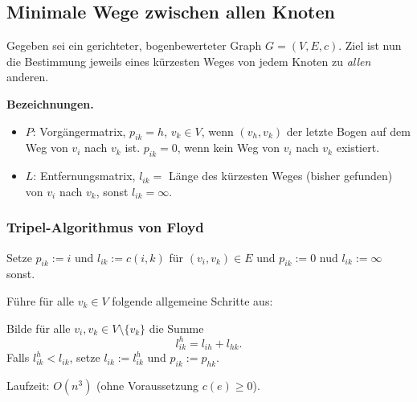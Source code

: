 \subsection{Minimale Wege zwischen allen Knoten}
Gegeben sei ein gerichteter, bogenbewerteter Graph $G = (V,E,c)$. Ziel ist nun
die Bestimmung jeweils eines kürzesten Weges von jedem Knoten zu \emph{allen}
anderen.

\textbf{Bezeichnungen.}
\begin{itemize}
\item $P$: Vorgängermatrix, $p_{ik} = h$, $v_k \in V$, wenn $(v_h, v_k)$ der
  letzte Bogen auf dem Weg von $v_i$ nach $v_k$ ist. $p_{ik} = 0$, wenn kein Weg
  von $v_i$ nach $v_k$ existiert.
\item $L$: Entfernungsmatrix, $l_{ik} =$ Länge des kürzesten Weges (bisher
  gefunden) von $v_i$ nach $v_k$, sonst $l_{ik} = \infty$.
\end{itemize}

\subsubsection*{Tripel-Algorithmus von Floyd}
Setze $p_{ik} := i$ und $l_{ik} := c(i,k)$ für $(v_i, v_k) \in E$ und
$p_{ik} := 0$ nud $l_{ik} := \infty$ sonst.

Führe für alle $v_k \in V$ folgende allgemeine Schritte aus:

Bilde für alle $v_i, v_k \in V \setminus \{ v_k \}$ die Summe
\[ l_{ik}^h = l_{ih} + l_{hk}. \]
Falls $l_{ik}^h < l_{ik}$, setze $l_{ik} := l_{ik}^h$ und $p_{ik} := p_{hk}$.

Laufzeit: $O(n^3)$ (ohne Voraussetzung $c(e) \ge 0$).

